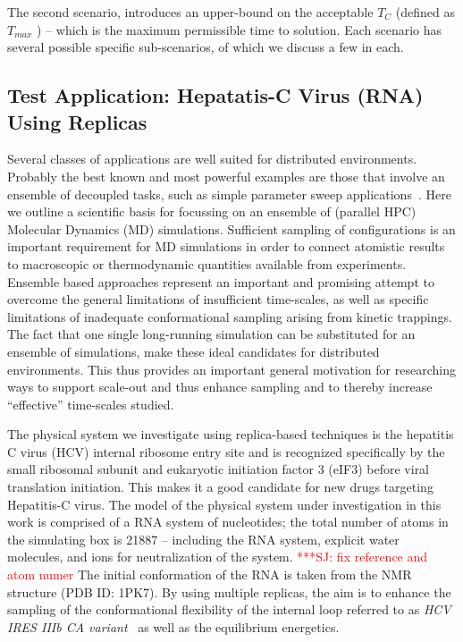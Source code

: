 \documentclass[conference,final]{IEEEtran}
\newcommand{\tmax}{$T_{max}$ }
\newcommand{\tc}{$T_{C}$ }
\newcommand{\jhanote}[1]{ {\textcolor{red} { ***SJ: #1 }}}
\newcommand{\jhanote}[1]{}
\begin{document}
The second scenario, introduces an upper-bound on the acceptable \tc
(defined as \tmax) -- which is the maximum permissible time to
solution. Each scenario has several possible specific sub-scenarios, of which we
discuss a few in each.

\subsection{Test Application: Hepatatis-C Virus (RNA) Using
  Replicas}

Several classes of applications are well suited for distributed
environments. Probably the best known and most powerful examples are
those that involve an ensemble of decoupled tasks, such as simple
parameter sweep applications~\cite{1239909}. Here we outline a
scientific basis for focussing on an ensemble of (parallel HPC)
Molecular Dynamics (MD) simulations.  Sufficient sampling of
configurations is an important requirement for MD simulations in order
to connect atomistic results to macroscopic or thermodynamic
quantities available from experiments.  Ensemble based approaches
represent an important and promising attempt to overcome the general
limitations of insufficient time-scales, as well as specific
limitations of inadequate conformational sampling arising from kinetic
trappings.  The fact that one single long-running simulation can be
substituted for an ensemble of simulations, make these ideal
candidates for distributed environments.  This thus provides an
important general motivation for researching ways to support scale-out
and thus enhance sampling and to thereby increase ``effective''
time-scales studied.

The physical system we investigate using replica-based techniques is
the hepatitis C virus (HCV) internal ribosome entry site and is
recognized specifically by the small ribosomal subunit and eukaryotic
initiation factor 3 (eIF3) before viral translation initiation.  This
makes it a good candidate for new drugs targeting Hepatitis-C virus.
The model of the physical system under investigation in this work is
comprised of a RNA system of nucleotides; the total number of atoms in
the simulating box is 21887 -- including the RNA system, explicit
water molecules, and ions for neutralization of the system.
\jhanote{fix reference and atom numer} The
initial conformation of the RNA is taken from the NMR structure (PDB
ID: 1PK7).  By using multiple replicas, the aim is to enhance the
sampling of the conformational flexibility of the internal loop
referred to as {\it HCV IRES IIIb CA variant}~\cite{Collier:2002wd} as
well as the equilibrium energetics.
\end{document}
